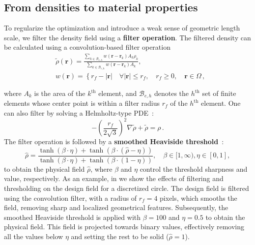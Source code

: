     \subsection*{From densities to material properties}
    To regularize the optimization and introduce a weak sense of geometric length
    scale, we filter
    the density field using a \textbf{filter operation}. The filtered density can
    be calculated using a
    convolution-based filter operation~\cite{projection}
    \begin{equation}
        \begin{aligned}
             & \tilde{\rho}(\mathbf{r})=\frac{\sum_{k \in \mathcal{B}_{e, h}}
                w\left(\mathbf{r}-\mathbf{r}_k\right) A_k \rho_k}{\sum_{k \in \mathcal{B}_{e,
            h}} w\left(\mathbf{r}-\mathbf{r}_k\right) A_k},                              \\
             & w(\mathbf{r})=\left\{r_f-|\mathbf{r}| \quad \forall|\mathbf{r}| \leq r_f,
            \quad r_f \geq 0, \quad \mathbf{r} \in \Omega\right.\,,
        \end{aligned}
    \end{equation}

    where $A_k$ is the area of the $k^\text{th}$ element, and $\mathcal{B}_{e, h}$ denotes
    the
$h^\text{th}$ set of finite elements whose center point is within a filter
    radius $r_f$ of the
$h^\text{th}$ element. One can also filter by solving a Helmholtz-type
    PDE~\cite{PDE_filter}:
    \begin{equation}
        -\left(\frac{r_f}{2 \sqrt{3}}\right)^2 \nabla
        \tilde{\rho}+\tilde{\rho}=\rho\,.
    \end{equation}
    The filter operation is followed by a \textbf{smoothed Heaviside
        threshold}~\cite{projection}:
    \begin{equation}
        \hat{\rho}=\frac{\tanh (\beta \cdot \eta)+\tanh (\beta
            \cdot(\hat{\rho}-\eta))}{\tanh (\beta \cdot \eta)+\tanh (\beta \cdot(1-\eta))},
        \quad \beta \in[1, \infty), \eta \in[0,1],
    \end{equation}
    to obtain the physical field $\hat{\rho}$, where $\beta$ and $\eta$ control the threshold sharpness and value,
    respectively. As an example, in 
     we show the effects of filtering and thresholding on the design field for a discretized circle.
    The design field is filtered using the convolution filter, with a radius of $r_f=4$ pixels, which smooths the field, removing sharp and localized
    geometrical features. Subsequently, the smoothed Heaviside threshold is applied with $\beta=100$ and $\eta=0.5$ to obtain the physical field. This field is projected towards binary 
    values, effectively removing all the values below $\eta$ and setting the rest to be solid ($\hat{\rho}=1$).


